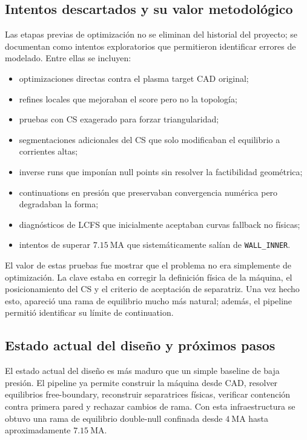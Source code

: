 \documentclass[11pt,a4paper]{article}
\begin{document}
\subsection{Intentos descartados y su valor metodológico}
Las etapas previas de optimización no se eliminan del historial del proyecto; se documentan
como intentos exploratorios que permitieron identificar errores de modelado. Entre ellas se
incluyen:

\begin{itemize}
    \item optimizaciones directas contra el plasma target CAD original;
    \item refines locales que mejoraban el score pero no la topología;
    \item pruebas con CS exagerado para forzar triangularidad;
    \item segmentaciones adicionales del CS que solo modificaban el equilibrio a corrientes altas;
    \item inverse runs que imponían null points sin resolver la factibilidad geométrica;
    \item continuations en presión que preservaban convergencia numérica pero degradaban la forma;
    \item diagnósticos de LCFS que inicialmente aceptaban curvas fallback no físicas;
    \item intentos de superar $7.15~\mathrm{MA}$ que sistemáticamente salían de \texttt{WALL\_INNER}.
\end{itemize}

El valor de estas pruebas fue mostrar que el problema no era simplemente de optimización. La
clave estaba en corregir la definición física de la máquina, el posicionamiento del CS y el
criterio de aceptación de separatriz. Una vez hecho esto, apareció una rama de equilibrio mucho
más natural; además, el pipeline permitió identificar su límite de continuation.

\subsection{Estado actual del diseño y próximos pasos}
El estado actual del diseño es más maduro que un simple baseline de baja presión. El pipeline
ya permite construir la máquina desde CAD, resolver equilibrios free-boundary, reconstruir
separatrices físicas, verificar contención contra primera pared y rechazar cambios de rama.
Con esta infraestructura se obtuvo una rama de equilibrio double-null confinada desde
$4~\mathrm{MA}$ hasta aproximadamente $7.15~\mathrm{MA}$.
\end{document}
